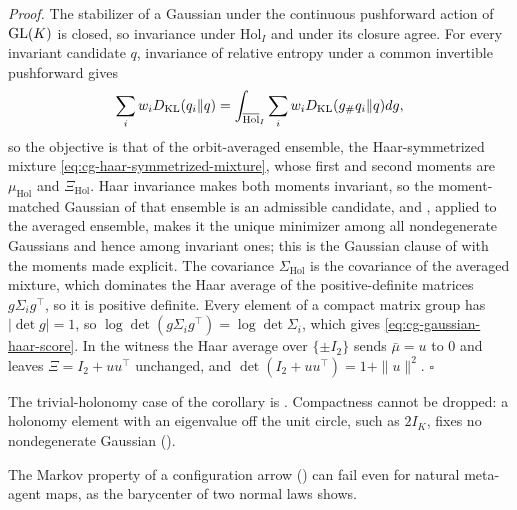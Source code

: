 \noindent\emph{Proof.}
The stabilizer of a Gaussian under the continuous pushforward action of
\(\mathrm{GL}(K)\) is closed, so invariance under \(\mathrm{Hol}_I\) and under its
closure agree. For every invariant candidate \(q\), invariance of relative
entropy under a common invertible pushforward gives
\begin{equation}
\sum_i w_iD_{\mathrm{KL}}(q_i\Vert q)
=\int_{\overline{\mathrm{Hol}}_I}\sum_i w_i
D_{\mathrm{KL}}(g_\#q_i\Vert q)dg,
\label{eq:cg-haar-objective-average}
\end{equation}
so the objective is that of the orbit-averaged ensemble, the Haar-symmetrized
mixture \eqref{eq:cg-haar-symmetrized-mixture}, whose first and second moments
are \(\mu_{\mathrm{Hol}}\) and \(\Xi_{\mathrm{Hol}}\). Haar invariance makes both
moments invariant, so the moment-matched Gaussian of that ensemble is an
admissible candidate, and , applied
to the averaged ensemble, makes it the unique minimizer among all nondegenerate
Gaussians and hence among invariant ones; this is the Gaussian clause of
 with the moments made explicit. The
covariance \(\Sigma_{\mathrm{Hol}}\) is the covariance of the averaged mixture,
which dominates the Haar average of the positive-definite matrices
\(g\Sigma_ig^\top\), so it is positive definite. Every element of a compact
matrix group has \(|\det g|=1\), so
\(\log\det(g\Sigma_ig^\top)=\log\det\Sigma_i\), which gives
\eqref{eq:cg-gaussian-haar-score}. In the witness the Haar average over
\(\{\pm I_2\}\) sends \(\bar\mu=u\) to \(0\) and leaves \(\Xi=I_2+uu^\top\)
unchanged, and \(\det(I_2+uu^\top)=1+\|u\|^2\). \(\square\)

The trivial-holonomy case of the corollary is
. Compactness cannot be dropped: a
holonomy element with an eigenvalue off the unit circle, such as \(2I_K\), fixes
no nondegenerate Gaussian ().

The Markov property of a configuration arrow () can fail
even for natural meta-agent maps, as the barycenter of two normal laws shows.

